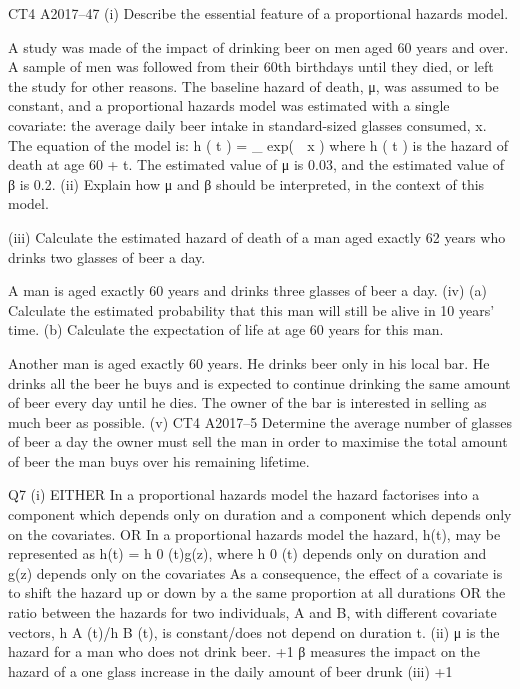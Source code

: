 \documentclass[a4paper,12pt]{article}
\begin{document}
CT4 A2017–47
(i)
Describe the essential feature of a proportional hazards model.

A study was made of the impact of drinking beer on men aged 60 years and over. A
sample of men was followed from their 60th birthdays until they died, or left the study
for other reasons. The baseline hazard of death, μ, was assumed to be constant, and a
proportional hazards model was estimated with a single covariate: the average daily
beer intake in standard-sized glasses consumed, x. The equation of the model is:
h ( t ) \;=\; \mu_ exp(  x )
where h ( t ) is the hazard of death at age 60 + t.
The estimated value of μ is 0.03, and the estimated value of β is 0.2.
(ii) Explain how μ and β should be interpreted, in the context of this model.

(iii) Calculate the estimated hazard of death of a man aged exactly 62 years who
drinks two glasses of beer a day.

A man is aged exactly 60 years and drinks three glasses of beer a day.
(iv)
(a) Calculate the estimated probability that this man will still be alive in
10 years’ time.
(b) Calculate the expectation of life at age 60 years for this man.

Another man is aged exactly 60 years. He drinks beer only in his local bar. He drinks
all the beer he buys and is expected to continue drinking the same amount of beer
every day until he dies. The owner of the bar is interested in selling as much beer as
possible.
(v)
CT4 A2017–5
Determine the average number of glasses of beer a day the owner must sell the
man in order to maximise the total amount of beer the man buys over his
remaining lifetime.


Q7
(i)
EITHER
In a proportional hazards model the hazard factorises 
into a component which depends only on duration and a
component which depends only on the covariates. 
OR
In a proportional hazards model the hazard, h(t), may be represented as
h(t) = h 0 (t)g(z), 
where h 0 (t) depends only on duration and g(z) depends only
on the covariates 
As a consequence, the effect of a covariate is to shift the hazard up or
down by a the same proportion at all durations OR the ratio between the
hazards for two individuals, A and B, with different
covariate vectors, h A (t)/h B (t), is constant/does not depend on duration t.
(ii)
μ is the hazard for a man who does not drink beer.
+1
β measures the impact on the hazard of a one glass increase in the daily
amount of beer drunk
(iii)
+1
\end{document}
